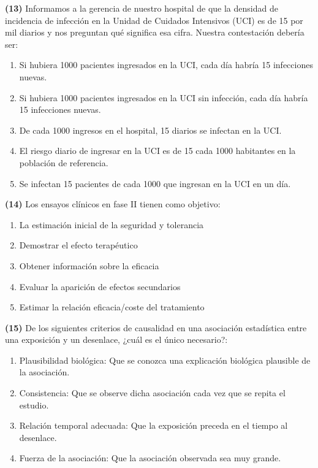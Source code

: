 \documentclass[
]{book}
\providecommand{\tightlist}{%
  \setlength{\itemsep}{0pt}\setlength{\parskip}{0pt}}
\theoremstyle{definition}
\theoremstyle{definition}
\theoremstyle{definition}
\theoremstyle{definition}
\theoremstyle{remark}
\begin{document}
\textbf{(13)} Informamos a la gerencia de nuestro hospital de que la densidad de incidencia de infección en la Unidad de Cuidados Intensivos (UCI) es de 15 por mil diarios y nos preguntan qué significa esa cifra. Nuestra contestación debería ser:

\begin{enumerate}
\def\labelenumi{\arabic{enumi}.}
\tightlist
\item
  Si hubiera 1000 pacientes ingresados en la UCI, cada día habría 15 infecciones nuevas.
\item
  Si hubiera 1000 pacientes ingresados en la UCI sin infección, cada día habría 15 infecciones nuevas.
\item
  De cada 1000 ingresos en el hospital, 15 diarios se infectan en la UCI.
\item
  El riesgo diario de ingresar en la UCI es de 15 cada 1000 habitantes en la población de referencia.
\item
  Se infectan 15 pacientes de cada 1000 que ingresan en la UCI en un día.
\end{enumerate}

\textbf{(14)} Los ensayos clínicos en fase II tienen como objetivo:

\begin{enumerate}
\def\labelenumi{\arabic{enumi}.}
\tightlist
\item
  La estimación inicial de la seguridad y tolerancia
\item
  Demostrar el efecto terapéutico
\item
  Obtener información sobre la eficacia
\item
  Evaluar la aparición de efectos secundarios
\item
  Estimar la relación eficacia/coste del tratamiento
\end{enumerate}

\textbf{(15)} De los siguientes criterios de causalidad en una asociación estadística entre una exposición y un desenlace, ¿cuál es el único necesario?:

\begin{enumerate}
\def\labelenumi{\arabic{enumi}.}
\tightlist
\item
  Plausibilidad biológica: Que se conozca una explicación biológica plausible de la asociación.
\item
  Consistencia: Que se observe dicha asociación cada vez que se repita el estudio.
\item
  Relación temporal adecuada: Que la exposición preceda en el tiempo al desenlace.
\item
  Fuerza de la asociación: Que la asociación observada sea muy grande.
\end{enumerate}
\end{document}
